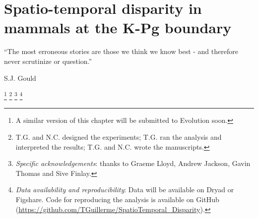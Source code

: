 

%
%

\chapter[Spatio-temporal disparity in mammals at the K-Pg boundary]{Spatio-temporal disparity in mammals at the K-Pg boundary}
\label{chap:STD_paper}

\bigskip
\medskip
\begin{center}

\begin{quoteshrink}
  ``The most erroneous stories are those we think we know best - and therefore never scrutinize or question.''

\hfill{S.J. Gould}


\end{quoteshrink}


\footnote{A similar version of this chapter will be submitted to Evolution soon.}
\footnote{T.G. and N.C. designed the experiments; T.G. ran the analysis and interpreted the results; T.G. and N.C. wrote the manuscripts.}
\footnote{\textit{Specific acknowledgements}: thanks to Graeme Lloyd, Andrew Jackson, Gavin Thomas and Sive Finlay.}
\footnote{\textit{Data availability and reproducibility}: Data will be available on Dryad or Figshare.
Code for reproducing the analysis is available on GitHub (\url{https://github.com/TGuillerme/SpatioTemporal_Disparity}).} \\

\end{center}
%
%
